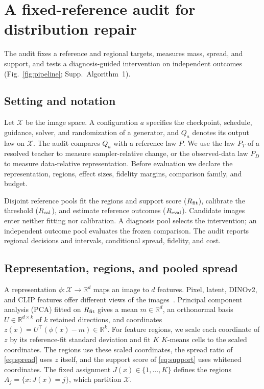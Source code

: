 \section{A fixed-reference audit for distribution repair}
\label{sec:method}
The audit fixes a reference and regional targets, measures mass, spread,
and support, and tests a diagnosis-guided intervention on independent
outcomes (Fig.~\ref{fig:pipeline}; Supp.~Algorithm~1).

\subsection{Setting and notation}
\label{sec:setting}
Let $\mathcal X$ be the image space. A configuration $a$ specifies the
checkpoint, schedule, guidance, solver, and randomization of a generator,
and $Q_a$ denotes its output law on $\mathcal X$. The audit compares $Q_a$
with a reference law $P$. We use the law $P_T$ of a resolved teacher to
measure sampler-relative change, or the observed-data law $P_D$ to measure
data-relative representation. Before evaluation we declare the
representation, regions, effect sizes, fidelity margins, comparison
family, and budget.

Disjoint reference pools fit the regions and support score
($R_{\rm fit}$), calibrate the threshold ($R_{\rm cal}$), and estimate
reference outcomes ($R_{\rm eval}$). Candidate images enter neither
fitting nor calibration. A diagnosis pool selects the intervention;
an independent outcome pool evaluates the frozen comparison. The audit
reports regional decisions and intervals, conditional spread, fidelity,
and cost.

\subsection{Representation, regions, and pooled spread}
\label{sec:regions}
A representation $\phi:\mathcal X\to\mathbb R^d$ maps an image to $d$
features. Pixel, latent, DINOv2, and CLIP features offer different views
of the images~\cite{oquab2024dinov2,radford2021clip}. Principal component
analysis (PCA) fitted on $R_{\rm fit}$ gives a mean $m\in\mathbb R^d$,
an orthonormal basis $U\in\mathbb R^{d\times k}$ of $k$ retained
directions, and coordinates $z(x)=U^\top(\phi(x)-m)\in\mathbb R^k$.
For feature regions, we scale each coordinate of $z$ by its reference-fit
standard deviation and fit $K$ $K$-means cells to the scaled coordinates.
The regions use these scaled coordinates, the spread ratio of
\cref{eq:spread} uses $z$ itself, and the support score of
\cref{eq:support} uses whitened coordinates. The fixed assignment
$J(x)\in\{1,\ldots,K\}$ defines the regions $A_j=\{x:J(x)=j\}$, which
partition $\mathcal X$.

